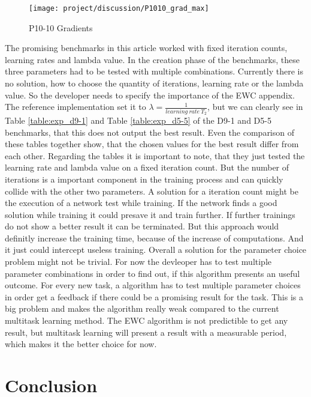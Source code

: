 \begin{figure}[H]
    \centering
    \texttt{[image: project/discussion/P1010\_grad\_max]}
    \caption{P10-10 Gradients}
    \label{fig:dis_d1010}
\end{figure}

The promising benchmarks in this article worked with fixed iteration counts, learning rates and lambda value.
In the creation phase of the benchmarks, these three parameters had to be tested with multiple combinations.
Currently there is no solution, how to choose the quantity of iterations, learning rate or the lambda value.
So the developer needs to specify the importance of the EWC appendix.
The reference implementation set it to $\lambda = \frac{1}{learning \: rate \: T_2 }$, but we can clearly see in Table \ref{table:exp_d9-1} and Table \ref{table:exp_d5-5} of the D9-1 and D5-5 benchmarks, that this does not output the best result.
Even the comparison of these tables together show, that the chosen values for the best result differ from each other.
Regarding the tables it is important to note, that they just tested the learning rate and lambda value on a fixed iteration count.
But the number of iterations is a important component in the training process and can quickly collide with the other two parameters.
A solution for a iteration count might be the execution of a network test while training.
If the network finds a good solution while training it could presave it and train further.
If further trainings do not show a better result it can be terminated.
But this approach would definitly increase the training time, because of the increase of computations.
And it just could intercept useless training.
Overall a solution for the parameter choice problem might not be trivial.
\newline
For now the devleoper has to test multiple parameter combinations in order to find out, if this algorithm presents an useful outcome.
For every new task, a algorithm has to test multiple parameter choices in order get a feedback if there could be a promising result for the task.
This is a big problem and makes the algorithm really weak compared to the current multitask learning method.
The EWC algorithm is not predictible to get any result, but multitask learning will present a result with a measurable period, which makes it the better choice for now.

\section{Conclusion}

